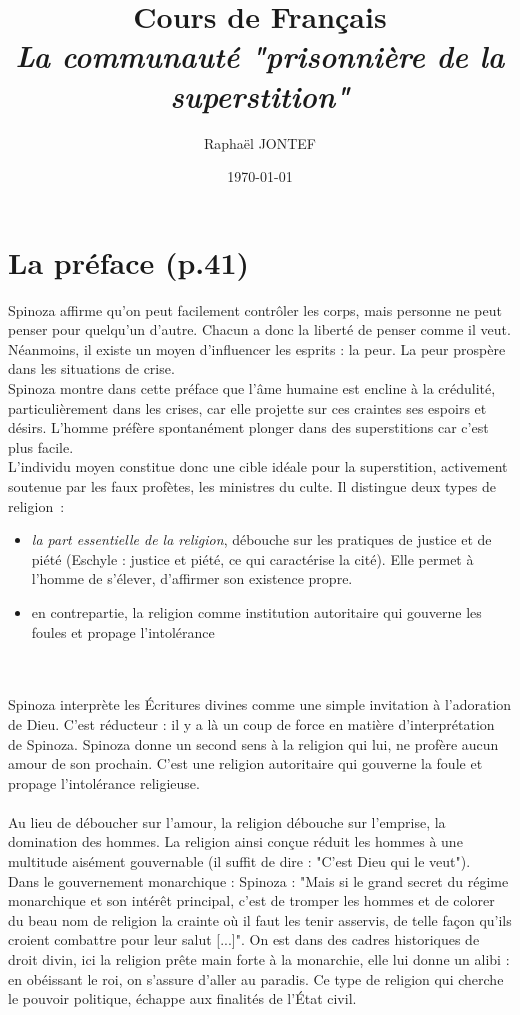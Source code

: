\documentclass[a4paper,12pt]{article}
\title{Cours de Français\\ \Large \textit{La communauté "prisonnière de la superstition"}}
\author{Raphaël JONTEF}
\date{\today}
\begin{document}
\section{La préface (p.41)}
Spinoza affirme qu'on peut facilement contrôler les corps, mais personne ne peut penser pour quelqu'un d'autre. Chacun a donc la liberté de penser comme il veut. Néanmoins, il existe un moyen d'influencer les esprits : la peur. La peur prospère dans les situations de crise.\\

Spinoza montre dans cette préface que l'âme humaine est encline à la crédulité, particulièrement dans les crises, car elle projette sur ces craintes ses espoirs et désirs. L'homme préfère spontanément plonger dans des superstitions car c'est plus facile. \\L'individu moyen constitue donc une cible idéale pour la superstition, activement soutenue par les faux profètes, les ministres du culte. Il distingue deux types de religion~:
\begin{itemize}
    \item \textit{la part essentielle de la religion}, débouche sur les pratiques de justice et de piété (Eschyle : justice et piété, ce qui caractérise la cité). Elle permet à l'homme de s'élever, d'affirmer son existence propre.
    \item en contrepartie, la religion comme institution autoritaire qui gouverne les foules et propage l'intolérance 
\end{itemize}\\\\
Spinoza interprète les Écritures divines comme une simple invitation à l'adoration de Dieu. C'est réducteur : il y a là un coup de force en matière d'interprétation de Spinoza. Spinoza donne un second sens à la religion qui lui, ne profère aucun amour de son prochain. C'est une religion autoritaire qui gouverne la foule et propage l'intolérance religieuse.\\ \\
Au lieu de déboucher sur l'amour, la religion débouche sur l'emprise, la domination des hommes. La religion ainsi conçue réduit les hommes à une multitude aisément gouvernable (il suffit de dire : "C'est Dieu qui le veut"). \\
Dans le gouvernement monarchique : Spinoza : "Mais si le grand secret du régime monarchique et son intérêt principal, c’est
de tromper les hommes et de colorer du beau nom de religion la crainte où il faut les tenir asservis, de telle façon qu’ils croient combattre pour leur salut [...]". On est dans des cadres historiques de droit divin, ici la religion prête main forte à la monarchie, elle lui donne un alibi : en obéissant le roi, on s'assure d'aller au paradis. Ce type de religion qui cherche le pouvoir politique, échappe aux finalités de l'État civil.\\
\end{document}
